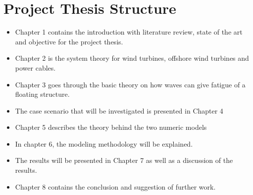 \section{Project Thesis Structure}
\begin{itemize}
    \item Chapter 1 contains the introduction with literature review, state of the art and objective for the project thesis.
     \item Chapter 2 is the system theory for wind turbines, offshore wind turbines and power cables.
      \item Chapter 3 goes through the basic theory on how waves can give fatigue of a floating structure. 
      \item The case scenario that will be investigated is presented in Chapter 4
      \item Chapter 5 describes the theory behind the two numeric models
      \item In chapter 6, the modeling methodology will be explained.
      \item The results will be presented in Chapter 7 as well as a discussion of the results.
      \item Chapter 8 contains the conclusion and suggestion of further work.
\end{itemize}